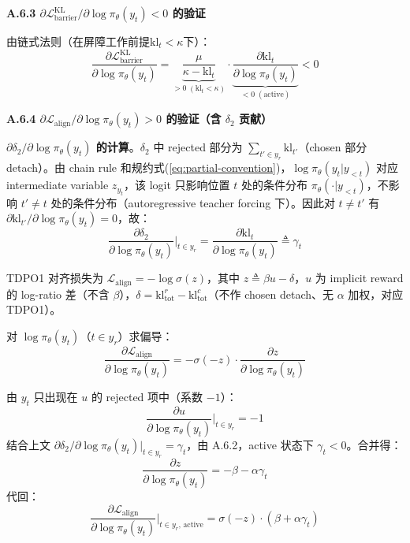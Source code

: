 \documentclass[lettersize,journal]{IEEEtran}
\begin{document}
\textbf{A.6.3 $\partial \mathcal{L}^{\text{KL}}_{\text{barrier}}/\partial \log\pi_\theta(y_t) < 0$ 的验证}

由链式法则（在屏障工作前提$\text{kl}_t < \kappa$下）：
\begin{equation}
\frac{\partial \mathcal{L}^{\text{KL}}_{\text{barrier}}}{\partial \log\pi_\theta(y_t)} = \underbrace{\frac{\mu}{\kappa - \text{kl}_t}}_{>0\;(\text{kl}_t<\kappa)} \cdot \underbrace{\frac{\partial \text{kl}_t}{\partial \log\pi_\theta(y_t)}}_{<0\;(\text{active})} < 0
\end{equation}

\textbf{A.6.4 $\partial \mathcal{L}_{\text{align}}/\partial \log\pi_\theta(y_t) > 0$ 的验证（含 $\delta_2$ 贡献）}

\textbf{$\partial \delta_2/\partial \log\pi_\theta(y_t)$ 的计算}。$\delta_2$ 中 rejected 部分为 $\sum_{t' \in y_r} \text{kl}_{t'}$（chosen 部分 detach）。由 chain rule 和规约式(\ref{eq:partial-convention})，$\log\pi_\theta(y_t|y_{<t})$ 对应 intermediate variable $z_{y_t}$，该 logit 只影响位置 $t$ 处的条件分布 $\pi_\theta(\cdot|y_{<t})$，不影响 $t' \neq t$ 处的条件分布（autoregressive teacher forcing 下）。因此对 $t \neq t'$ 有 $\partial \text{kl}_{t'}/\partial \log\pi_\theta(y_t) = 0$，故：
\begin{equation}
\frac{\partial \delta_2}{\partial \log\pi_\theta(y_t)}\bigg|_{t\in y_r} = \frac{\partial \text{kl}_t}{\partial \log\pi_\theta(y_t)} \triangleq \gamma_t
\end{equation}

TDPO1 对齐损失为 $\mathcal{L}_{\text{align}} = -\log\sigma(z)$，其中 $z \triangleq \beta u - \delta$，$u$ 为 implicit reward 的 log-ratio 差（不含 $\beta$），$\delta = \text{kl}^r_{\text{tot}} - \text{kl}^c_{\text{tot}}$（不作 chosen detach、无 $\alpha$ 加权，对应 TDPO1）。

对 $\log\pi_\theta(y_t)$（$t \in y_r$）求偏导：
\begin{equation}
\frac{\partial \mathcal{L}_{\text{align}}}{\partial \log\pi_\theta(y_t)} = -\sigma(-z) \cdot \frac{\partial z}{\partial \log\pi_\theta(y_t)}
\end{equation}

由 $y_t$ 只出现在 $u$ 的 rejected 项中（系数 $-1$）：
\begin{equation}
\frac{\partial u}{\partial \log\pi_\theta(y_t)}\bigg|_{t\in y_r} = -1
\end{equation}
结合上文 $\partial \delta_2/\partial \log\pi_\theta(y_t)|_{t\in y_r} = \gamma_t$，由 A.6.2，active 状态下 $\gamma_t < 0$。合并得：
\begin{equation}
\frac{\partial z}{\partial \log\pi_\theta(y_t)} = -\beta - \alpha\gamma_t
\end{equation}
代回：
\begin{equation}\label{eq:dL-align-full}
\frac{\partial \mathcal{L}_{\text{align}}}{\partial \log\pi_\theta(y_t)}\bigg|_{t \in y_r,\,\text{active}} = \sigma(-z) \cdot (\beta + \alpha\gamma_t)
\end{equation}
\end{document}
